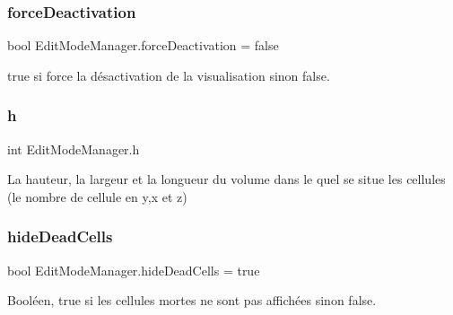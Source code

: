 \mbox{\label{class_edit_mode_manager_a2b9b6468cc837ee97b01202de2972129}} 
\subsubsection{\texorpdfstring{force\+Deactivation}{forceDeactivation}}
{\footnotesize\ttfamily bool Edit\+Mode\+Manager.\+force\+Deactivation = false\hspace{0.3cm}{\ttfamily [private]}}



true si force la désactivation de la visualisation sinon false. 

\mbox{\label{class_edit_mode_manager_ad0e09cececc48bcb4e7b768fa35dc954}} 
\subsubsection{\texorpdfstring{h}{h}}
{\footnotesize\ttfamily int Edit\+Mode\+Manager.\+h\hspace{0.3cm}{\ttfamily [private]}}



La hauteur, la largeur et la longueur du volume dans le quel se situe les cellules (le nombre de cellule en y,x et z) 

\mbox{\label{class_edit_mode_manager_a2ad2ba7ae4c1faa2444b397f587f8adf}} 
\subsubsection{\texorpdfstring{hide\+Dead\+Cells}{hideDeadCells}}
{\footnotesize\ttfamily bool Edit\+Mode\+Manager.\+hide\+Dead\+Cells = true\hspace{0.3cm}{\ttfamily [private]}}



Booléen, true si les cellules mortes ne sont pas affichées sinon false. 

